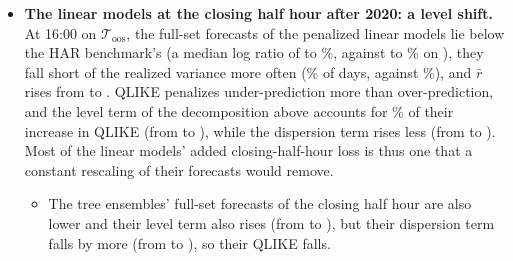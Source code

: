 \begin{itemize}
\begin{itemize}
    $\rhcaLinMsePctBarOosExCrashMax\%$ for the linear models, $\rhcaTreeMsePctBarOosExCrashMin$ to
    $\rhcaTreeMsePctBarOosExCrashMax\%$ for the trees) and the lower MAE, each statistically significant at the 5\%
    level.
  \item \textbf{Calibrated in logs.} QLIKE behaves like a loss on $\ln r_t$: it weights an error by its size relative
    to the forecast and grows only logarithmically in over-prediction, so the bars of the crash, which dominate the
    squared error, weigh little in it. In logs the full-set forecasts are well scaled (slope
    \rhcaLinFullMzlBBarOosRng{} for the linear models on every bar of
    $\mathcal T_{\mathrm{oos}}$) and more informative than the HAR benchmark of the same class in both periods ($R^2$ of
    \rhcaLinFullMzlRsqBarOosRng{} for the linear models and
    \rhcaTreeFullMzlRsqBarOosRng{} for the trees, against
    \rhcaAllHarMzlRsqBarOosRng).
  \end{itemize}

\item \textbf{The linear models at the closing half hour after 2020: a level shift.} At 16:00 on
  $\mathcal T_{\mathrm{oos}}$, the full-set forecasts of the penalized linear models lie below the HAR benchmark's (a
  median log ratio of \rhcaLinMedLogRatioCloseOosMin{} to \rhcaLinMedLogRatioCloseOosMax\%, against
  \rhcaLinMedLogRatioClosePreMin{} to \rhcaLinMedLogRatioClosePreMax\% on \rhcaYearsPre), they fall short of the realized
  variance more often (\rhcaLinFullUnderCloseOosRng\% of days, against
  \rhcaLinHarUnderCloseOos\%), and $\bar r$ rises from \rhcaLinHarMrCloseOos{} to
  \rhcaLinFullMrCloseOosRng. QLIKE penalizes under-prediction more than over-prediction, and
  the level term of the decomposition above accounts for \rhcaLinQlShareCloseOosRng\% of
  their increase in QLIKE (from \rhcaLinHarQlCloseOos{} to \rhcaLinFullQlCloseOosRng), while
  the dispersion term rises less (from \rhcaLinHarQdCloseOos{} to
  \rhcaLinFullQdCloseOosRng). Most of the linear models' added closing-half-hour loss is
  thus one that a constant rescaling of their forecasts would remove.
  \begin{itemize}
  \item The tree ensembles' full-set forecasts of the closing half hour are also lower and their level term also rises
    (from \rhcaTreeHarQlCloseOosRng{} to
    \rhcaTreeFullQlCloseOosRng), but their dispersion term falls by more (from
    \rhcaTreeHarQdCloseOosRng{} to \rhcaTreeFullQdCloseOosRng), so
    their QLIKE falls.
  \end{itemize}
\end{itemize}
